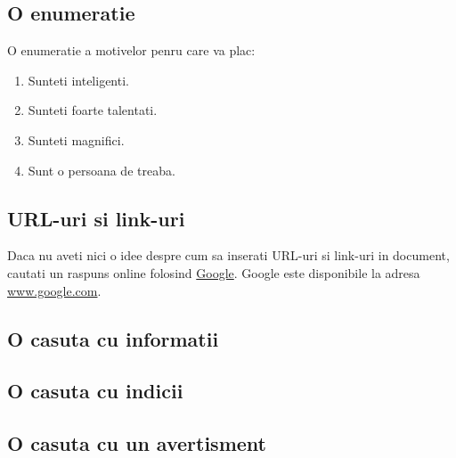 \documentclass{42-en}
\begin{document}
        \subsection{O enumeratie}

            O enumeratie a motivelor penru care va plac:\\

            \begin{enumerate}\itemsep7pt
                \item Sunteti inteligenti.
                \item Sunteti foarte talentati.
                \item Sunteti magnifici.
                \item Sunt o persoana de treaba.
            \end{enumerate}


        \subsection{URL-uri si link-uri}

            Daca nu aveti nici o idee despre cum sa inserati URL-uri si link-uri
            in document, cautati un raspuns online folosind
            \href{www.google.com}{Google}. Google este disponibile la adresa
            \url{www.google.com}.


        \newpage


        \subsection{O casuta cu informatii}



        \subsection{O casuta cu indicii}



        \subsection{O casuta cu un avertisment}

\end{document}
